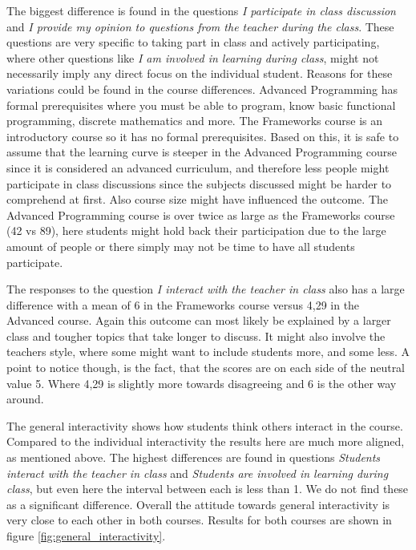 The biggest difference is found in the questions \emph{I participate in class discussion} and \emph{I provide my opinion to questions from the teacher during the class}. These questions are very specific to taking part in class and actively participating, where other questions like \emph{I am involved in learning during class}, might not necessarily imply any direct focus on the individual student. Reasons for these variations could be found in the course differences. Advanced Programming has formal prerequisites where you must be able to program, know basic functional programming, discrete mathematics and more. The Frameworks course is an introductory course so it has no formal prerequisites. Based on this, it is safe to assume that the learning curve is steeper in the Advanced Programming course since it is considered an advanced curriculum, and therefore less people might participate in class discussions since the subjects discussed might be harder to comprehend at first. Also course size might have influenced the outcome. The Advanced Programming course is over twice as large as the Frameworks course (42 vs 89), here students might hold back their participation due to the large amount of people or there simply may not be time to have all students participate.

The responses to the question \emph{I interact with the teacher in class} also has a large difference with a mean of 6 in the Frameworks course versus 4,29 in the Advanced course. Again this outcome can most likely be explained by a larger class and tougher topics that take longer to discuss. It might also involve the teachers style, where some might want to include students more, and some less. A point to notice though, is the fact, that the scores are on each side of the neutral value 5. Where 4,29 is slightly more towards disagreeing and 6 is the other way around.

The general interactivity shows how students think others interact in the course. Compared to the individual interactivity the results here are much more aligned, as mentioned above. The highest differences are found in questions \emph{Students interact with the teacher in class} and \emph{Students are involved in learning during class}, but even here the interval between each is less than 1. We do not find these as a significant difference. Overall the attitude towards general interactivity is very close to each other in both courses. Results for both courses are shown in figure \ref{fig:general_interactivity}.

